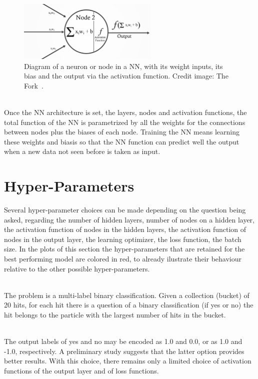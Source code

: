 \begin{figure}[h]
  \centering
  \includegraphics[width=0.6\textwidth]{./plots/Neuron.png}
  \caption{Diagram of a neuron or node in a NN, with its weight inputs, its bias and the output via the activation function. Credit image: The Fork~\cite{TheFork}.}
  \label{fig:Neuron}
\end{figure}

\ \\Once the NN architecture is set, the layers, nodes and activation functions, the total function of the NN is parametrized by all the weights for the connections between nodes plus the biases of each node. Training the NN means learning these weights and biasis so that the NN function can predict well the output when a new data not seen before is taken as input.

\section{Hyper-Parameters}
\label{sec:Hyperparameters}

Several hyper-parameter choices can be made depending on the question being asked, regarding the number of hidden layers, number of nodes on a hidden layer, the activation function of nodes in the hidden layers, the activation function of nodes in the output layer, the learning optimizer, the loss function, the batch size. In the plots of this section the hyper-parameters that are retained for the best performing model are colored in red, to already ilustrate their behaviour relative to the other possible hyper-parameters.

\ \\The problem is a multi-label binary classification. Given a collection (bucket) of 20 hits, for each hit there is a question of a binary classification (if yes or no) the hit belongs to the particle with the largest number of hits in the bucket. 

\ \\The output labels of yes and no may be encoded as 1.0 and 0.0, or as 1.0 and -1.0, respectively. A preliminary study suggests that the latter option provides better results. With this choice, there remains only a limited choice of activation functions of the output layer and of loss functions. 

